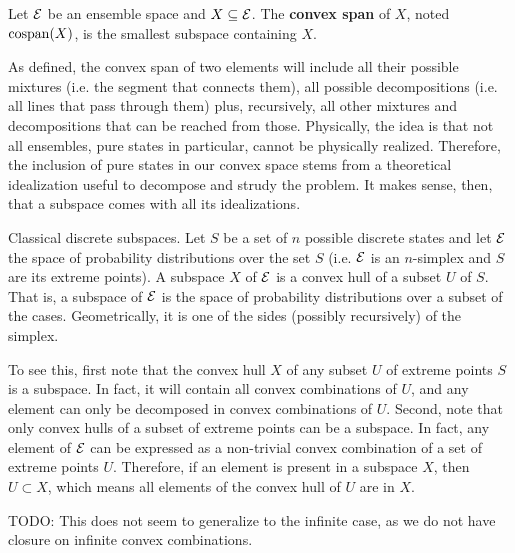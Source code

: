 \begin{defn}
	Let $\mathcal{E}$ be an ensemble space and $X \subseteq \mathcal{E}$.  The \textbf{convex span} of $X$, noted $\mathrm{cospan}(X)$, is the smallest subspace containing $X$.
\end{defn}

\begin{remark}
	As defined, the convex span of two elements will include all their possible mixtures (i.e. the segment that connects them), all possible decompositions (i.e. all lines that pass through them) plus, recursively, all other mixtures and decompositions that can be reached from those. Physically, the idea is that not all ensembles, pure states in particular, cannot be physically realized. Therefore, the inclusion of pure states in our convex space stems from a theoretical idealization useful to decompose and strudy the problem. It makes sense, then, that a subspace comes with all its idealizations.
\end{remark}

\begin{example} Classical discrete subspaces.
	Let $S$ be a set of $n$ possible discrete states and let $\mathcal{E}$ the space of probability distributions over the set $S$ (i.e. $\mathcal{E}$ is an $n$-simplex and $S$ are its extreme points). A subspace $X$ of $\mathcal{E}$ is a convex hull of a subset $U$ of $S$. That is, a subspace of $\mathcal{E}$ is the space of probability distributions over a subset of the cases. Geometrically, it is one of the sides (possibly recursively) of the simplex.
	
	To see this, first note that the convex hull $X$ of any subset $U$ of extreme points $S$ is a subspace. In fact, it will contain all convex combinations of $U$, and any element can only be decomposed in convex combinations of $U$. Second, note that only convex hulls of a subset of extreme points can be a subspace. In fact, any element of $\mathcal{E}$ can be expressed as a non-trivial convex combination of a set of extreme points $U$. Therefore, if an element is present in a subspace $X$, then $U \subset X$, which means all elements of the convex hull of $U$ are in $X$.
	
	TODO: This does not seem to generalize to the infinite case, as we do not have closure on infinite convex combinations.
\end{example}

